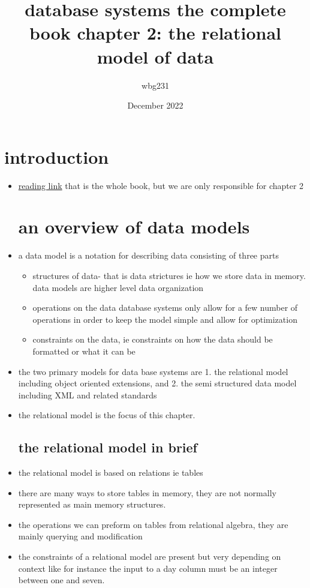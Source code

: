 \documentclass{article}
\title{database systems the complete book chapter 2: the relational model of data}
\author{wbg231 }
\date{December 2022}
\begin{document}
\maketitle

\section{introduction}
\begin{itemize}
\item \href{https://people.inf.elte.hu/miiqaai/elektroModulatorDva.pdf}{reading link} that is the whole book, but we are only responsible for chapter 2 
\section{an overview of data models}
\item a data model is a notation for describing data consisting of three parts 
\begin{itemize}
    \item structures of data- that is data strictures ie how we store data in memory. data models are higher level data organization 
    \item operations on the data database systems only allow for a few number of operations in order to keep the model simple and allow for optimization
    \item constraints on the data, ie constraints on how the data should be formatted or what it can be 
\end{itemize}
\item the two primary models for data base systems are 1. the relational model including object oriented extensions, and 2. the semi structured data model including XML and related standards
\item the relational model is the focus of this chapter. 
\subsection{the relational model in brief}
\item the relational model is based on relations ie tables 
\item there are many ways to store tables in memory, they are not normally represented as main memory structures.
\item the operations we can preform on tables from relational algebra, they are mainly querying and modification 
\item the constraints of a relational model are present but very depending on context like for instance the input to a day column must be an integer between one and seven.

\end{itemize}
\end{document}
